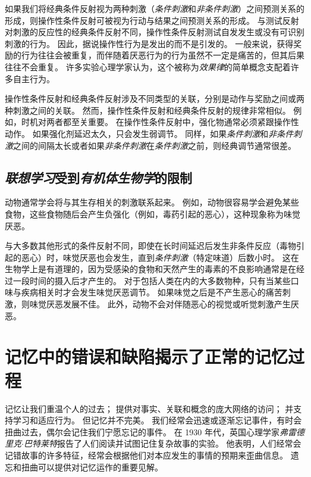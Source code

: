 如果我们将经典条件反射视为两种刺激（\textit{条件刺激}和\textit{非条件刺激}）之间预测关系的形成，则操作性条件反射可被视为行动与结果之间预测关系的形成。
与测试反射对刺激的反应性的经典条件反射不同，操作性条件反射测试自发发生或没有可识别刺激的行为。
因此，据说操作性行为是发出的而不是引发的。
一般来说，获得奖励的行为往往会被重复，而伴随着厌恶行为的行为虽然不一定是痛苦的，但其后果往往不会重复。
许多实验心理学家认为，这个被称为\textit{效果律}的简单概念支配着许多自主行为。


操作性条件反射和经典条件反射涉及不同类型的关联，分别是动作与奖励之间或两种刺激之间的关联。
然而，操作性条件反射和经典条件反射的规律非常相似。
例如，时机对两者都至关重要。
在操作性条件反射中，强化物通常必须紧跟操作性动作。
如果强化剂延迟太久，只会发生弱调节。
同样，如果\textit{条件刺激}和\textit{非条件刺激}之间的间隔太长或者如果\textit{非条件刺激}在\textit{条件刺激}之前，则经典调节通常很差。



\subsection{\textit{联想学习}受到\textit{有机体生物学}的限制}

动物通常学会将与其生存相关的刺激联系起来。
例如，动物很容易学会避免某些食物，这些食物随后会产生负强化（例如，毒药引起的恶心），这种现象称为味觉厌恶。


与大多数其他形式的条件反射不同，即使在长时间延迟后发生非条件反应（毒物引起的恶心）时，味觉厌恶也会发生，直到\textit{条件刺激}（特定味道）后数小时。
这在生物学上是有道理的，因为受感染的食物和天然产生的毒素的不良影响通常是在经过一段时间的摄入后才产生的。
对于包括人类在内的大多数物种，只有当某些口味与疾病相关时才会发生味觉厌恶调节。
如果味觉之后是不产生恶心的痛苦刺激，则味觉厌恶发展不佳。
此外，动物不会对伴随恶心的视觉或听觉刺激产生厌恶。



\section{记忆中的错误和缺陷揭示了正常的记忆过程}

记忆让我们重温个人的过去； 提供对事实、关联和概念的庞大网络的访问；
并支持学习和适应行为。
但记忆并不完美。
我们经常会迅速或逐渐忘记事件，有时会扭曲过去，偶尔会记住我们宁愿忘记的事件。
在 1930 年代，英国心理学家\textit{弗雷德里克$\cdot$巴特莱特}报告了人们阅读并试图记住复杂故事的实验。
他表明，人们经常会记错故事的许多特征，经常会根据他们对本应发生的事情的预期来歪曲信息。
遗忘和扭曲可以提供对记忆运作的重要见解。



